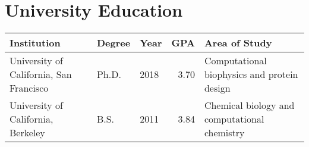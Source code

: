 \section{University Education}

\begin{tabularx}{\linewidth}{XllrX}

\toprule

Institution &
Degree &
Year &
GPA &
Area of Study \\

\midrule

University of California, San Francisco &
Ph.D. &
2018 &
3.70 &
Computational biophysics and protein design \\

University of California, Berkeley &
B.S. &
2011 &
3.84 &
Chemical biology and computational chemistry \\

\bottomrule

\end{tabularx}

